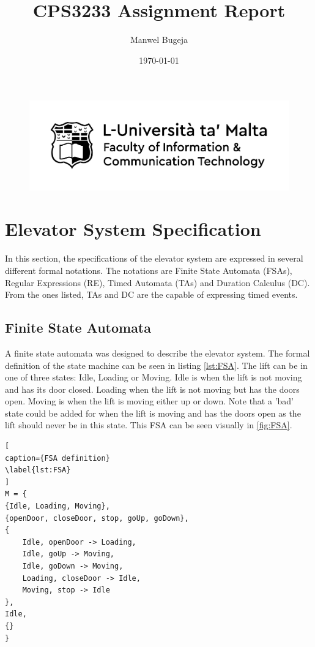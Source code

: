 \documentclass[a4paper, 12pt]{article}
\begin{document}
\begin{figure}
    \centering
    \includegraphics[width=1\textwidth]{Logo}
\end{figure}

\title{CPS3233 Assignment Report}
\author{Manwel Bugeja}
\date{\today}
\maketitle
  
\tableofcontents
\newpage

\section{Elevator System Specification}
In this section, the specifications of the elevator system are expressed in several different formal notations. The notations are Finite State Automata (FSAs), Regular Expressions (RE), Timed Automata (TAs) and Duration Calculus (DC). From the ones listed, TAs and DC are the capable of expressing timed events. \\

\subsection{Finite State Automata}
A finite state automata was designed to describe the elevator system. The formal definition of the state machine can be seen in listing \ref{lst:FSA}. The lift can be in one of three states: Idle, Loading or Moving. Idle is when the lift is not moving and has its door closed. Loading when the lift is not moving but has the doors open. Moving is when the lift is moving either up or down. Note that a 'bad' state could be added for when the lift is moving and has the doors open as the lift should never be in this state.
This FSA can be seen visually in \ref{fig:FSA}. \\



\begin{lstlisting}[
caption={FSA definition}
\label{lst:FSA}
]
M = {
{Idle, Loading, Moving},
{openDoor, closeDoor, stop, goUp, goDown},
{
    Idle, openDoor -> Loading,
    Idle, goUp -> Moving,
    Idle, goDown -> Moving,
    Loading, closeDoor -> Idle,
    Moving, stop -> Idle
},
Idle,
{}
}
\end{lstlisting}
\end{document}
